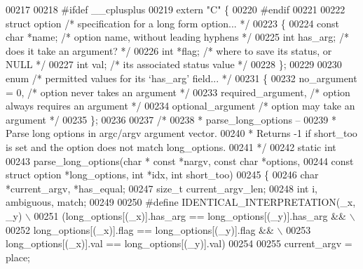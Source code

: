 \begin{DoxyCode}
{{{{{{{00217 
00218 \textcolor{preprocessor}{#ifdef \_\_cplusplus}
00219 \textcolor{keyword}{extern} \textcolor{stringliteral}{"C"} \{
00220 \textcolor{preprocessor}{#endif}
00221 
00222 \textcolor{keyword}{struct }option       \textcolor{comment}{/* specification for a long form option...  */}
00223 \{
00224   \textcolor{keyword}{const} \textcolor{keywordtype}{char} *name;     \textcolor{comment}{/* option name, without leading hyphens */}
00225   \textcolor{keywordtype}{int}         has_arg;      \textcolor{comment}{/* does it take an argument?        */}
00226   \textcolor{keywordtype}{int}        *flag;     \textcolor{comment}{/* where to save its status, or NULL    */}
00227   \textcolor{keywordtype}{int}         val;      \textcolor{comment}{/* its associated status value      */}
00228 \};
00229 
00230 \textcolor{keyword}{enum}            \textcolor{comment}{/* permitted values for its `has\_arg' field...  */}
00231 \{
00232   no_argument = 0,          \textcolor{comment}{/* option never takes an argument   */}
00233   required_argument,        \textcolor{comment}{/* option always requires an argument   */}
00234   optional_argument     \textcolor{comment}{/* option may take an argument      */}
00235 \};
00236 
00237 \textcolor{comment}{/*}
00238 \textcolor{comment}{ * parse\_long\_options --}
00239 \textcolor{comment}{ *  Parse long options in argc/argv argument vector.}
00240 \textcolor{comment}{ * Returns -1 if short\_too is set and the option does not match long\_options.}
00241 \textcolor{comment}{ */}
00242 \textcolor{keyword}{static} \textcolor{keywordtype}{int}
00243 parse_long_options(\textcolor{keywordtype}{char} * \textcolor{keyword}{const} *nargv, \textcolor{keyword}{const} \textcolor{keywordtype}{char} *options,
00244     \textcolor{keyword}{const} \textcolor{keyword}{struct} option *long\_options, \textcolor{keywordtype}{int} *idx, \textcolor{keywordtype}{int} short\_too)
00245 \{
00246     \textcolor{keywordtype}{char} *current\_argv, *has\_equal;
00247     \textcolor{keywordtype}{size\_t} current\_argv\_len;
00248     \textcolor{keywordtype}{int} i, ambiguous, match;
00249 
00250 \textcolor{preprocessor}{#define IDENTICAL\_INTERPRETATION(\_x, \_y)                                \(\backslash\)}
00251 \textcolor{preprocessor}{    (long\_options[(\_x)].has\_arg == long\_options[(\_y)].has\_arg &&    \(\backslash\)}
00252 \textcolor{preprocessor}{     long\_options[(\_x)].flag == long\_options[(\_y)].flag &&          \(\backslash\)}
00253 \textcolor{preprocessor}{     long\_options[(\_x)].val == long\_options[(\_y)].val)}
00254 
00255     current\_argv = place;
}}}}}}}
\end{DoxyCode}
